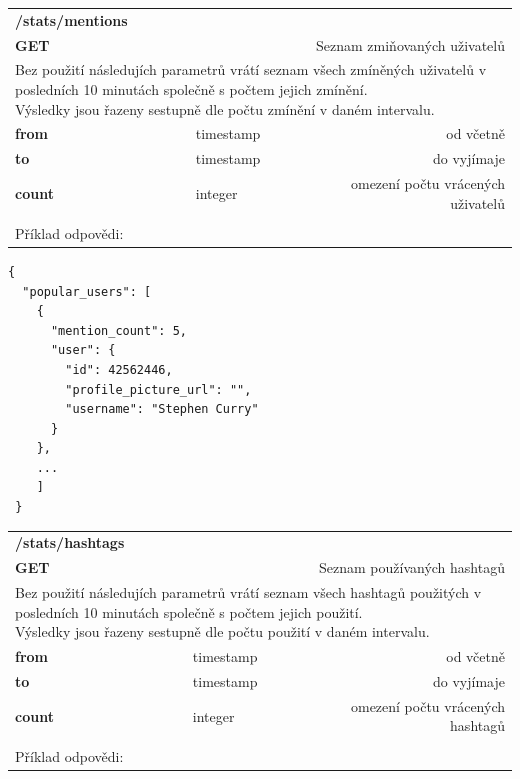 \documentclass[thesis=B,czech]{FITthesis}[2012/06/26]
\begin{document}
\begin{table}[h]
\begin{tabular}{llllr}
\rowcolor[HTML]{EFEFEF}
\large \textbf{/stats/mentions}        &         &                 &        & \multicolumn{1}{l}{}                \\
\rowcolor[HTML]{EFEFEF}
\textbf{GET}          &         &                 &        & Seznam zmiňovaných uživatelů                        \\
\multicolumn{5}{l}{\parbox[t]{12.8cm}{Bez použití následujích parametrů vrátí seznam všech zmíněných uživatelů v posledních 10 minutách společně s počtem jejich zmínění. \\ Výsledky jsou řazeny sestupně dle počtu zmínění v daném intervalu. }  } \\
\textbf{from}         &         & timestamp       &        & od včetně                           \\
\textbf{to}           &         & timestamp       &        & do vyjímaje                         \\
\textbf{count}        &         & integer         &        & omezení počtu vrácených uživatelů     \\ 
 & & & & \\
 Příklad odpovědi:
\end{tabular}
\end{table}

\begin{lstlisting}[float=H]
{
  "popular_users": [
    {
      "mention_count": 5,
      "user": {
        "id": 42562446,
        "profile_picture_url": "",
        "username": "Stephen Curry"
      }
    },
    ...
    ]
 }
\end{lstlisting} 

\begin{table}[h]
\begin{tabular}{llllr}
\rowcolor[HTML]{EFEFEF}
\large \textbf{/stats/hashtags}        &         &                 &        & \multicolumn{1}{l}{}                \\
\rowcolor[HTML]{EFEFEF}
\textbf{GET}          &         &                 &        & Seznam používaných hashtagů                        \\
\multicolumn{5}{l}{\parbox[t]{12.8cm}{Bez použití následujích parametrů vrátí seznam všech hashtagů použitých v posledních 10 minutách společně s počtem jejich použití. \\ Výsledky jsou řazeny sestupně dle počtu použití v daném intervalu. }  } \\
\textbf{from}         &         & timestamp       &        & od včetně                           \\
\textbf{to}           &         & timestamp       &        & do vyjímaje                         \\
\textbf{count}        &         & integer         &        & omezení počtu vrácených hashtagů     \\
 & & & & \\
 Příklad odpovědi: 
\end{tabular}
\end{table}
\end{document}
